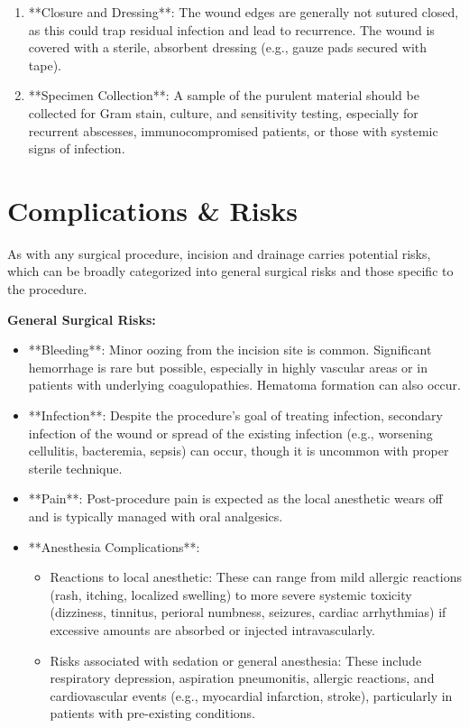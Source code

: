 \begin{enumerate}
  \item **Closure and Dressing**: The wound edges are generally not sutured closed, as this could trap residual infection and lead to recurrence. The wound is covered with a sterile, absorbent dressing (e.g., gauze pads secured with tape).

  \item **Specimen Collection**: A sample of the purulent material should be collected for Gram stain, culture, and sensitivity testing, especially for recurrent abscesses, immunocompromised patients, or those with systemic signs of infection.
\end{enumerate}

\section*{Complications \& Risks}
As with any surgical procedure, incision and drainage carries potential risks, which can be broadly categorized into general surgical risks and those specific to the procedure.

\textbf{General Surgical Risks:}
\begin{itemize}
  \item **Bleeding**: Minor oozing from the incision site is common. Significant hemorrhage is rare but possible, especially in highly vascular areas or in patients with underlying coagulopathies. Hematoma formation can also occur.

  \item **Infection**: Despite the procedure's goal of treating infection, secondary infection of the wound or spread of the existing infection (e.g., worsening cellulitis, bacteremia, sepsis) can occur, though it is uncommon with proper sterile technique.

  \item **Pain**: Post-procedure pain is expected as the local anesthetic wears off and is typically managed with oral analgesics.

  \item **Anesthesia Complications**:
    \begin{itemize}
      \item Reactions to local anesthetic: These can range from mild allergic reactions (rash, itching, localized swelling) to more severe systemic toxicity (dizziness, tinnitus, perioral numbness, seizures, cardiac arrhythmias) if excessive amounts are absorbed or injected intravascularly.

      \item Risks associated with sedation or general anesthesia: These include respiratory depression, aspiration pneumonitis, allergic reactions, and cardiovascular events (e.g., myocardial infarction, stroke), particularly in patients with pre-existing conditions.
    \end{itemize}
\end{itemize}

